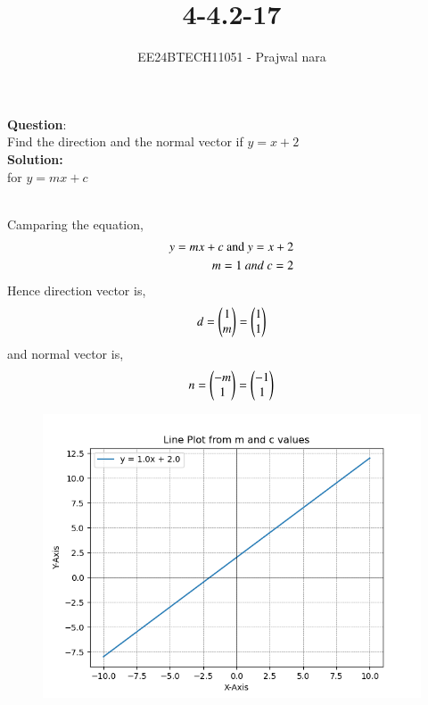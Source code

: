 \documentclass[journal]{IEEEtran}
\begin{document}

\vspace{3cm}

\title{4-4.2-17}
\author{EE24BTECH11051 - Prajwal nara
}
{\let\newpage\relax\maketitle}

\renewcommand{\thefigure}{\theenumi}
\renewcommand{\thetable}{\theenumi}
\setlength{\intextsep}{10pt} %


\renewcommand{\thetable}{\theenumi}


\textbf{Question}:\\
Find the direction and the normal vector if $y=x+2$
\\ \textbf{Solution: }\\
for $y=mx+c$
    \begin{table}[h!]    
      \centering
      
      \caption{}
    \end{table}\\
Camparing the equation,
\begin{align}
    y=mx+c \ \text{and} \ y=x+2 \\
    m=1 \text \ {and} \ c=2
\end{align}
Hence direction vector is,
\begin{align}
    d = \begin{pmatrix}1 \\ m\end{pmatrix}=\begin{pmatrix}1 \\ 1\end{pmatrix} 
\end{align}
and normal vector is,
\begin{align}
    n = \begin{pmatrix}-m \\ 1\end{pmatrix}=\begin{pmatrix}-1 \\ 1\end{pmatrix}
\end{align}

    \begin{figure}[h]
        \centering
       \includegraphics[width=0.7\linewidth]{figs/fig1.png}
       \caption{}
       \label{graph}
    \end{figure}
\end{document}
